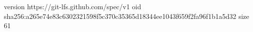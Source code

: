 version https://git-lfs.github.com/spec/v1
oid sha256:a265e74e83c6302321598f5c370c35365d18344ee1043f659f2fa96f1b1a5d32
size 61

